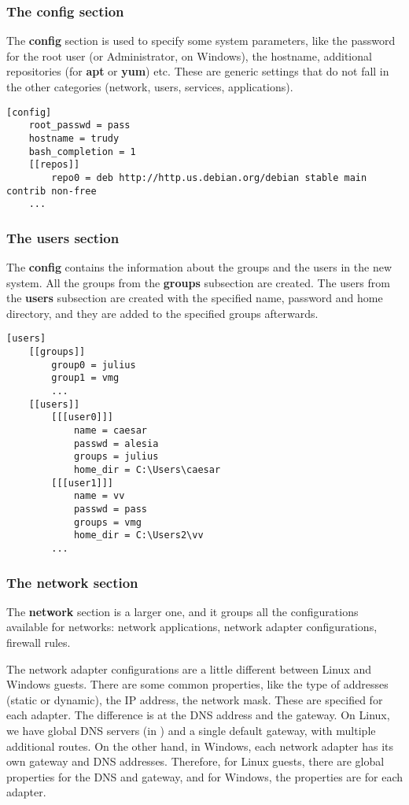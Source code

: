 \subsubsection{The config section}
\label{sub-sub-sec:config-sec}
The \textbf{config} section is used to specify some system parameters, like the
password for the root user (or Administrator, on Windows), the hostname,
additional repositories (for \textbf{apt} or \textbf{yum}) etc. These are
generic settings that do not fall in the other categories (network, users,
services, applications).

\lstset{caption=sample config section (Linux guest),label=lst:config-section}
\begin{lstlisting}
[config]
	root_passwd = pass
	hostname = trudy
	bash_completion = 1
	[[repos]]
		repo0 = deb http://http.us.debian.org/debian stable main contrib non-free
	...
\end{lstlisting}

\subsubsection{The users section}
The \textbf{config} contains the information about the groups and the users in
the new system. All the groups from the \textbf{groups} subsection are created.
The users from the \textbf{users} subsection are created with the specified
name, password and home directory, and they are added to the specified groups
afterwards.

\label{sub-sub-sec:users-sec}
\lstset{caption=sample users section (Windows guest),label=lst:users-section}
\begin{lstlisting}
[users]
	[[groups]]
		group0 = julius
		group1 = vmg
		...
	[[users]]
		[[[user0]]]
			name = caesar
			passwd = alesia
			groups = julius
			home_dir = C:\Users\caesar
		[[[user1]]]
			name = vv
			passwd = pass
			groups = vmg
			home_dir = C:\Users2\vv
		...
\end{lstlisting}


\subsubsection{The network section}
\label{sub-sub-sec:network-sec}
The \textbf{network} section is a larger one, and it groups all the
configurations available for networks: network applications, network adapter
configurations, firewall rules.

The network adapter configurations are a little different between Linux and
Windows guests. There are some common properties, like the type of addresses
(static or dynamic), the IP address, the network mask. These are specified for
each adapter. The difference is at the DNS address and the gateway. On Linux,
we have global DNS servers (in ) and a single default
gateway, with multiple additional routes. On the other hand, in Windows, each
network adapter has its own gateway and DNS addresses. Therefore, for Linux
guests, there are global properties for the DNS and gateway, and for Windows,
the properties are for each adapter.

